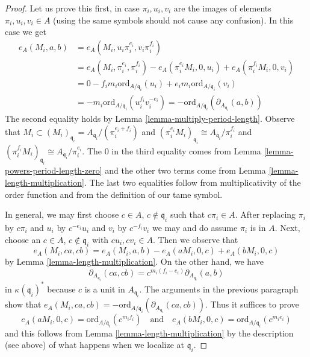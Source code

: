 \begin{proof}
\medskip\noindent
Let us prove this first, in case $\pi_i, u_i, v_i$ are the images
of elements $\pi_i, u_i, v_i \in A$ (using the same symbols
should not cause any confusion). In this case we get
\begin{align*}
e_A(M_i, a, b) & =
e_A(M_i, u_i\pi_i^{e_i}, v_i\pi_i^{f_i}) \\
& =
e_A(M_i, \pi_i^{e_i}, \pi_i^{f_i}) -
e_A(\pi_i^{e_i}M_i, 0, u_i) +
e_A(\pi_i^{f_i}M_i, 0, v_i) \\
& =
0 -
f_im_i\text{ord}_{A/\mathfrak q_i}(u_i) +
e_im_i\text{ord}_{A/\mathfrak q_i}(v_i) \\
& =
-m_i\text{ord}_{A/\mathfrak q_i}(u_i^{f_i}v_i^{-e_i}) =
-\text{ord}_{A/\mathfrak q_i}(\partial_{A_{\mathfrak q_i}}(a, b))
\end{align*}
The second equality holds by Lemma \ref{lemma-multiply-period-length}.
Observe that
$M_i \subset (M_i)_{\mathfrak q_i} = A_{\mathfrak q_i}/(\pi_i^{e_i + f_i})$
and
$(\pi_i^{e_i}M_i)_{\mathfrak q_i} \cong A_{\mathfrak q_i}/\pi_i^{f_i}$ and
$(\pi_i^{f_i}M_i)_{\mathfrak q_i} \cong A_{\mathfrak q_i}/\pi_i^{e_i}$.
The $0$ in the third equality comes from
Lemma \ref{lemma-powers-period-length-zero}
and the other two terms come from
Lemma \ref{lemma-length-multiplication}.
The last two equalities follow from multiplicativity of
the order function and from the definition of our tame symbol.

\medskip\noindent
In general, we may first choose $c \in A$, $c \not \in \mathfrak q_i$
such that $c\pi_i \in A$. After replacing $\pi_i$ by $c\pi_i$
and $u_i$ by $c^{-e_i}u_i$ and $v_i$ by $c^{-f_i}v_i$
we may and do assume $\pi_i$ is in $A$.
Next, choose an $c \in A$, $c \not \in \mathfrak q_i$
with $cu_i, cv_i \in A$. Then we observe that
$$
e_A(M_i, ca, cb) = e_A(M_i, a, b) - e_A(aM_i, 0, c) + e_A(bM_i, 0, c)
$$
by Lemma \ref{lemma-length-multiplication}.
On the other hand, we have
$$
\partial_{A_{\mathfrak q_i}}(ca, cb) =
c^{m_i(f_i - e_i)}\partial_{A_{\mathfrak q_i}}(a, b)
$$
in $\kappa(\mathfrak q_i)^*$ because $c$ is a unit in $A_{\mathfrak q_i}$.
The arguments in the previous paragraph show that
$e_A(M_i, ca, cb) = -
\text{ord}_{A/\mathfrak q_i}(\partial_{A_{\mathfrak q_i}}(ca, cb))$.
Thus it suffices to prove
$$
e_A(aM_i, 0, c) = \text{ord}_{A/\mathfrak q_i}(c^{m_if_i})
\quad\text{and}\quad
e_A(bM_i, 0, c) = \text{ord}_{A/\mathfrak q_i}(c^{m_ie_i})
$$
and this follows from Lemma \ref{lemma-length-multiplication}
by the description (see above)
of what happens when we localize at $\mathfrak q_i$.
\end{proof}


